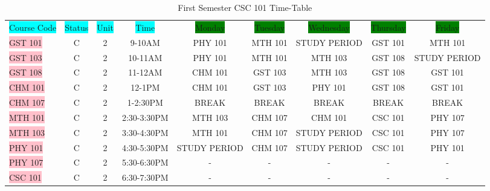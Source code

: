 \documentclass{article}
\begin{document}
\begin{table}[h!]
	\begin{center}
		\caption{First Semester CSC 101 Time-Table}
		\label{tab: Table 1}
		\begin{tabular}{|l|c|c|c|c|c|c|c|c|}
		\colorbox{cyan}{Course Code}&
		\colorbox{cyan}{Status}&
		\colorbox{cyan}{Unit}&
		\colorbox{cyan}{Time}&
		\colorbox{green}{Monday}&
		\colorbox{green}{Tuesday}&
		\colorbox{green}{Wednesday}&
		\colorbox{green}{Thursday}&
		\colorbox{green}{Friday}\\
		
		\colorbox{pink}{GST 101} & C & 2 & 9-10AM & PHY 101 & MTH 101 & STUDY PERIOD & GST 101 & MTH 101\\
		\colorbox{pink}{GST 103} & C & 2 & 10-11AM & PHY 101 & MTH 101 & MTH 103 & GST 108 & STUDY PERIOD\\
		\colorbox{pink}{GST 108} & C & 2 & 11-12AM & CHM 101 & GST 103 & MTH 103 & GST 108 & GST 101\\
		\colorbox{pink}{CHM 101} & C & 2 & 12-1PM & CHM 101 & GST 103 & PHY 101 & GST 108 & GST 101\\
		\colorbox{pink}{CHM 107} & C & 2 & 1-2:30PM & BREAK & BREAK & BREAK & BREAK & BREAK\\
		\colorbox{pink}{MTH 101} & C & 2 & 2:30-3:30PM & MTH 103 & CHM 107 & CHM 101 & CSC 101 & PHY 107\\
		\colorbox{pink}{MTH 103} & C & 2 & 3:30-4:30PM & MTH 101 & CHM 107 & STUDY PERIOD & CSC 101 & PHY 107\\
		\colorbox{pink}{PHY 101} & C & 2 & 4:30-5:30PM & STUDY PERIOD & CHM 107 & STUDY PERIOD & CSC 101 & PHY 101\\
		\colorbox{pink}{PHY 107} & C & 2 & 5:30-6:30PM & - & - & - & - & -\\
		\colorbox{pink}{CSC 101} & C & 2 & 6:30-7:30PM & - & - & - & - & -\\
		   
			
	
		\end{tabular}
	\end{center}
\end{table}

	


	
	
	
\end{document}
